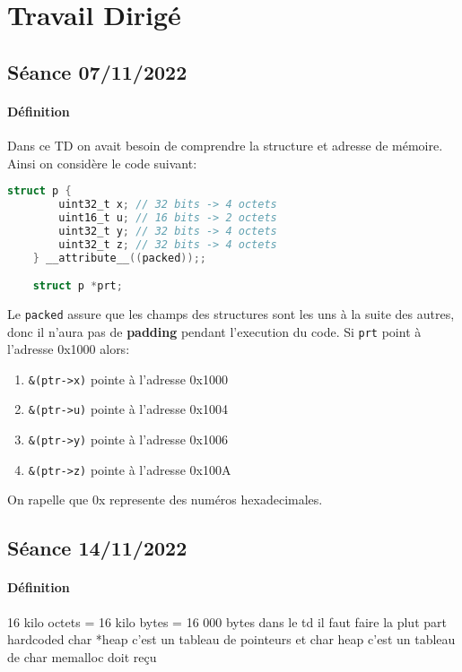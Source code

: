 \documentclass{article}
\begin{document}
\section{Travail Dirigé}
\subsection{Séance 07/11/2022}
\paragraph{Définition}Dans ce TD on avait besoin de comprendre la structure et adresse de mémoire. Ainsi on considère le code suivant:
\begin{scriptsize}\mycode
    \begin{lstlisting}[language=C]
    struct p {
        uint32_t x; // 32 bits -> 4 octets
        uint16_t u; // 16 bits -> 2 octets
        uint32_t y; // 32 bits -> 4 octets
        uint32_t z; // 32 bits -> 4 octets
    } __attribute__((packed));;

    struct p *prt;
    \end{lstlisting}
\end{scriptsize}
Le \texttt{packed} assure que les champs des structures sont les uns à la suite des autres, donc il n'aura pas de \textbf{padding} pendant l'execution du code. Si \texttt{prt} point à l'adresse 0x1000 alors:
\begin{enumerate}[noitemsep]
    \item \texttt{\&(ptr->x)} pointe à l'adresse 0x1000
    \item \texttt{\&(ptr->u)} pointe à l'adresse 0x1004
    \item \texttt{\&(ptr->y)} pointe à l'adresse 0x1006
    \item \texttt{\&(ptr->z)} pointe à l'adresse 0x100A
\end{enumerate}
On rapelle que 0x represente des numéros hexadecimales.

\newpage\subsection{Séance 14/11/2022}
\paragraph{Définition}16 kilo octets = 16 kilo bytes = 16 000 bytes
dans le td il faut faire la plut part hardcoded
char *heap c'est un tableau de pointeurs et char heap c'est un tableau de char
memalloc doit reçu
\end{document}
